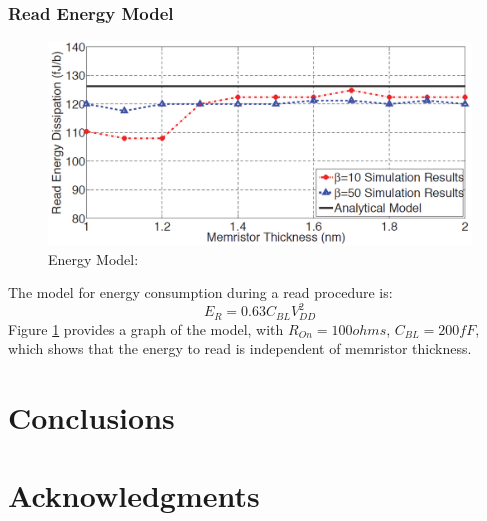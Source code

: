 \documentclass{sig-alternate}
\begin{document}
\subsubsection{Read Energy Model} 
\begin{figure}
  \includegraphics[scale=.29]{readEnergy.png}
  \caption{Energy Model: }
  \label{fig:readEnergy}
\end{figure}
The model for energy consumption during a read procedure is:
\begin{equation*}
E_{R} = 0.63C_{BL}V^2_{DD}
\end{equation*}
Figure \ref{fig:readEnergy} provides a graph of the model, with $R_{On} = 100 ohms $, $C_{BL} = 200fF$, which shows that the energy to read is independent of memristor thickness.
\section{Conclusions}
\label{sec:conclusions}


\section*{Acknowledgments}
\label{sec:acknowledgments}




  
\end{document}
